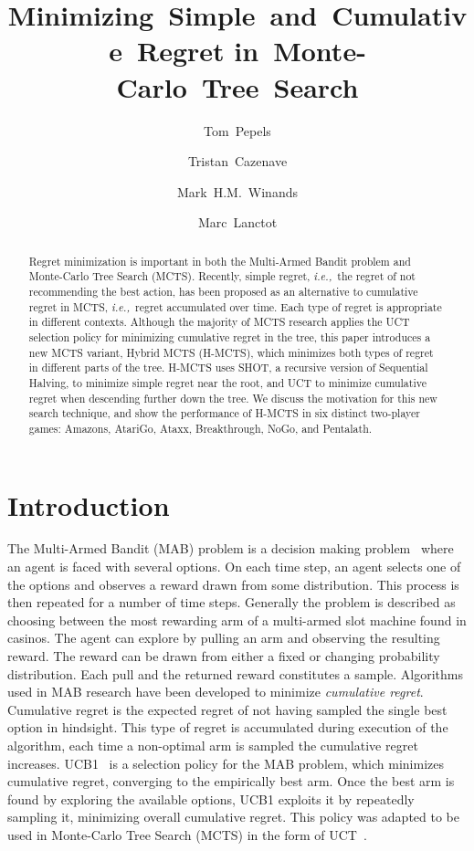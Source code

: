 \documentclass[a4paper]{llncs}
\title{Minimizing~Simple~and~Cumulative~Regret in~Monte-Carlo~Tree~Search}
\author{Tom~Pepels\inst{1} \and Tristan~Cazenave\inst{2} \and
Mark~H.M.~Winands\inst{1} \and Marc~Lanctot\inst{1}}
\institute{Department of Knowledge Engineering,  Maastricht University\\ \email{\{tom.pepels,m.winands,marc.lanctot\}@maastrichtuniversity.nl} \and LAMSADE - Université Paris-Dauphine \\ \email{cazenave@lamsade.dauphine.fr}}
\newcommand{\ie}{{\it i.e.,}~}
\begin{document}
\maketitle

\begin{abstract} Regret minimization is important in both the Multi-Armed Bandit problem and Monte-Carlo Tree Search (MCTS). Recently, simple regret, \ie the regret of not recommending the best action, has been proposed as an alternative to cumulative regret in MCTS, \ie regret accumulated over time. Each type of regret is appropriate in different contexts. Although the majority of MCTS research applies the UCT selection policy for minimizing cumulative regret in the tree, this paper introduces a new MCTS variant, Hybrid MCTS (H-MCTS), which minimizes both types of regret in different parts of the tree. H-MCTS uses SHOT, a recursive version of Sequential Halving, to minimize simple regret near the root, and UCT to minimize cumulative regret when descending further down the tree. We discuss the motivation for this new search technique, and show the performance of H-MCTS in six distinct two-player games: Amazons, AtariGo, Ataxx, Breakthrough, NoGo, and Pentalath.

\end{abstract}

\section{Introduction}
\label{sec:intro}

The Multi-Armed Bandit (MAB) problem is a decision making problem~\cite{auer2002using} where an agent is faced with several options. On each time step, an agent selects one of the options and observes a reward drawn from some distribution. This process is then repeated for a number of time steps.
Generally the problem is described as choosing between the most rewarding arm of a multi-armed slot machine found in casinos. The agent can explore by pulling an arm and observing the resulting reward. The reward can be drawn from either a fixed or changing probability distribution. Each pull and the returned reward constitutes a sample. Algorithms used in MAB research have been developed to minimize \emph{cumulative regret}. Cumulative regret is the expected regret of not having sampled the single best option in hindsight. This type of regret is accumulated during execution of the algorithm, each time a non-optimal arm is sampled the cumulative regret increases. UCB1~\cite{auer2002using} is a selection policy for the MAB problem, which minimizes cumulative regret, converging to the empirically best arm. Once the best arm is found by exploring the available options, UCB1 exploits it by repeatedly sampling it, minimizing overall cumulative regret. This policy was adapted to be used in Monte-Carlo Tree Search (MCTS) in the form of UCT~\cite{kocsis2006bandit}.
\end{document}
